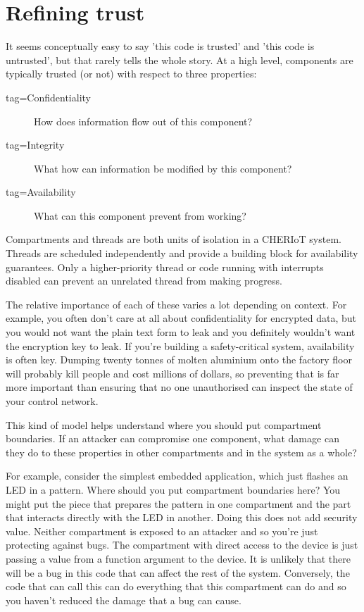 \section{Refining trust}

It seems conceptually easy to say 'this code is trusted' and 'this code is untrusted', but that rarely tells the whole story.
At a high level, components are typically trusted (or not) with respect to three properties:

\begin{description}
	\item[tag=Confidentiality]{How does information flow out of this component?}
	\item[tag=Integrity]{What how can information be modified by this component?}
	\item[tag=Availability]{What can this component prevent from working?}
\end{description}

\begin{note}
Compartments and threads are both units of isolation in a CHERIoT system.
Threads are scheduled independently and provide a building block for availability guarantees.
Only a higher-priority thread or code running with interrupts disabled can prevent an unrelated thread from making progress.
\end{note}

The relative importance of each of these varies a lot depending on context.
For example, you often don't care at all about confidentiality for encrypted data, but you would not want the plain text form to leak and you definitely wouldn't want the encryption key to leak.
If you're building a safety-critical system, availability is often key.
Dumping twenty tonnes of molten aluminium onto the factory floor will probably kill people and cost millions of dollars, so preventing that is far more important than ensuring that no one unauthorised can inspect the state of your control network.

This kind of model helps understand where you should put compartment boundaries.
If an attacker can compromise one component, what damage can they do to these properties in other compartments and in the system as a whole?

For example, consider the simplest embedded application, which just flashes an LED in a pattern.
Where should you put compartment boundaries here?
You might put the piece that prepares the pattern in one compartment and the part that interacts directly with the LED in another.
Doing this does not add security value.
Neither compartment is exposed to an attacker and so you're just protecting against bugs.
The compartment with direct access to the device is just passing a value from a function argument to the device.
It is unlikely that there will be a bug in this code that can affect the rest of the system.
Conversely, the code that can call this can do everything that this compartment can do and so you haven't reduced the damage that a bug can cause.

